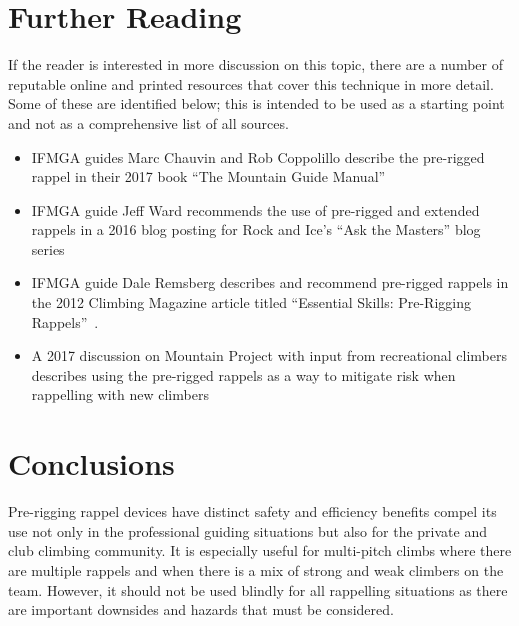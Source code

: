 \documentclass[nonacm,acmtog]{acmart}
\begin{document}
\section{Further Reading}
\label{sec:reading}

If the reader is interested in more discussion on this topic, there are a
number of reputable online and printed resources that cover this technique in
more detail.  Some of these are identified below; this is intended to be used
as a starting point and not as a comprehensive list of all sources.

\begin{itemize}
\item IFMGA guides Marc Chauvin and Rob Coppolillo describe the pre-rigged
   rappel in their 2017 book ``The Mountain Guide Manual'' \cite[pp. 182-183]{mgm}
\item IFMGA guide Jeff Ward recommends the use of pre-rigged and extended
   rappels in a 2016 blog posting for Rock and Ice's ``Ask the Masters'' blog
   series~\cite{www:ri-askthemaster-prerigged}
\item IFMGA guide Dale Remsberg describes and recommend pre-rigged rappels in
   the 2012 Climbing Magazine article titled ``Essential Skills: Pre-Rigging
   Rappels''~\cite{www:climbing-prerigged}.
\item A 2017 discussion on Mountain Project with input from recreational
   climbers describes using the pre-rigged rappels as a way to mitigate risk
   when rappelling with new climbers~\cite{www:mp-prerigged}
\end{itemize}

\section{Conclusions}
\label{sec:conclusion}

  Pre-rigging rappel devices have distinct safety and efficiency benefits
  compel its use not only in the professional guiding situations but also for
  the private and club climbing community. It is especially useful for
  multi-pitch climbs where there are multiple rappels and when there is a mix
  of strong and weak climbers on the team.  However, it should not be used
  blindly for all rappelling situations as there are important downsides and
  hazards that must be considered.



\end{document}
